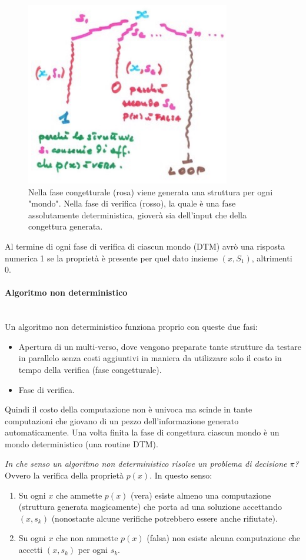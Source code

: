 \documentclass{article}
\begin{document}
\begin{figure}[H]
    \centering
    \includegraphics[scale=0.6]{images/dinamica_albero.png}
    \caption{Nella fase congetturale (rosa) viene generata una struttura per ogni "mondo".
    Nella fase di verifica (rosso), la quale è una fase assolutamente deterministica,
    gioverà sia dell'input che della congettura generata.}
\end{figure}
Al termine di ogni fase di verifica di ciascun mondo (DTM) avrò una risposta numerica
1 se la proprietà è presente per quel dato insieme $(x,S_1)$, altrimenti 0.

\paragraph{Algoritmo non deterministico}\mbox{}\\
Un algoritmo non deterministico funziona proprio con queste due fasi:
\begin{itemize}
    \item Apertura di un multi-verso, dove vengono preparate tante strutture
    da testare in parallelo senza costi aggiuntivi in maniera da utilizzare
    solo il costo in tempo della verifica (fase congetturale).
    \item Fase di verifica.
\end{itemize}
Quindi il costo della computazione non è univoca ma scinde in tante computazioni che
giovano di un pezzo dell'informazione generato automaticamente. Una volta finita la fase
di congettura ciascun mondo è un mondo deterministico (una routine DTM).

\textit{In che senso un algoritmo non deterministico risolve un problema
di decisione $\pi$?} Ovvero la verifica della proprietà $p(x)$.
In questo senso:
\begin{enumerate}
    \item Su ogni $x$ che ammette $p(x)$ (vera) esiste
    almeno una computazione (struttura generata magicamente) che porta ad una
    soluzione accettando $(x,s_k)$ (nonostante alcune verifiche potrebbero
    essere anche rifiutate).

    \item Su ogni $x$ che non ammette $p(x)$ (falsa) non esiste alcuna
    computazione che accetti $(x,s_k)$ per ogni $s_k$.
\end{enumerate}
\end{document}
